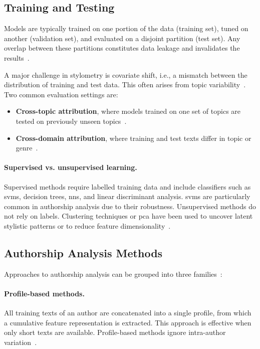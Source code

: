 \subsection{Training and Testing}

Models are typically trained on one portion of the data (training set), tuned on another (validation set), and evaluated on a disjoint partition (test set). 
Any overlap between these partitions constitutes data leakage and invalidates the results~\citep{bischoff_importance_2020,altakrori_topic_2021,boenninghoff_o2d2_2021}. 

A major challenge in stylometry is covariate shift, i.e., a mismatch between the distribution of training and test data. 
This often arises from topic variability~\citep{boenninghoff_o2d2_2021}. 
Two common evaluation settings are:
\begin{itemize}
    \item \textbf{Cross-topic attribution}, where models trained on one set of topics are tested on previously unseen topics~\citep{altakrori_topic_2021}.  
    \item \textbf{Cross-domain attribution}, where training and test texts differ in topic or genre~\citep{barlas_cross_domain_2020}.  
\end{itemize}

\paragraph{Supervised vs. unsupervised learning.}  
Supervised methods require labelled training data and include classifiers such as \acp{svm}, decision trees, \acp{nn}, and linear discriminant analysis. 
\acp{svm} are particularly common in authorship analysis due to their robustness. 
Unsupervised methods do not rely on labels.
Clustering techniques or \ac{pca} have been used to uncover latent stylistic patterns or to reduce feature dimensionality~\citep{abbasi_writeprints_2008}.


\subsection{Authorship Analysis Methods}
\label{subsec:attribution_methods}

Approaches to authorship analysis can be grouped into three families~\citep{stamatatos_survey_2009}:

\paragraph{Profile-based methods.} 
All training texts of an author are concatenated into a single profile, from which a cumulative feature representation is extracted. 
This approach is effective when only short texts are available.
Profile-based methods ignore intra-author variation~\citep{stamatatos_survey_2009,elmanarelbouanani_authorship_2014,neal_surveying_2018}.  


